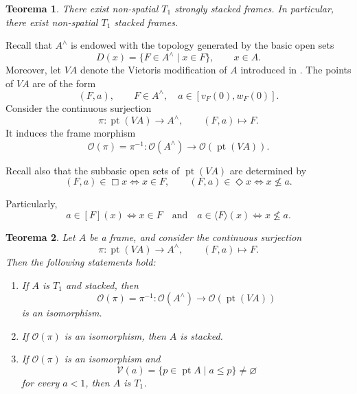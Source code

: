 \documentclass[11pt]{amsart}
\DeclareMathOperator{\pt}{pt}
\theoremstyle{plain}
\newtheorem{thm}{Teorema}[section]
\theoremstyle{definition}
\begin{document}
\begin{thm}\label{T1apiladonoespacial}
There exist non-spatial $T_1$ strongly stacked frames. In particular, there
exist non-spatial $T_1$ stacked frames.
\end{thm}

Recall that $A^\wedge$ is endowed with the topology generated by the basic
open sets
\[
D(x)=\{F\in A^\wedge\mid x\in F\},
\qquad x\in A.
\]
Moreover, let $VA$ denote the Vietoris modification of $A$ introduced in
\cite{johnstone2020vietoris}. The points of $VA$ are of the form
\[
(F,a),
\qquad
F\in A^\wedge,\quad
a\in[v_F(0),w_F(0)].
\]
Consider the continuous surjection
\[
\pi\colon\pt(VA)\longrightarrow A^\wedge,
\qquad
(F,a)\longmapsto F.
\]
It induces the frame morphism
\[
\mathcal{O}(\pi)=\pi^{-1}\colon
\mathcal{O}(A^\wedge)\longrightarrow
\mathcal{O}(\pt(VA)).
\]

Recall also that the subbasic open sets of $\pt(VA)$ are determined by
\begin{equation}\label{fibra}
(F,a)\in\Box x
\Longleftrightarrow
x\in F,
\qquad
(F,a)\in\Diamond x
\Longleftrightarrow
x\nleq a.
\end{equation}

Particularly,
\begin{equation}\label{fibra2}
a\in [F](x)\iff x\in F\quad \text{and}\quad a\in \langle F\rangle(x)\iff x\nleq a.
\end{equation}

\begin{thm}\label{IsoVA}
Let $A$ be a frame, and consider the continuous surjection
\[
\pi\colon\pt(VA)\longrightarrow A^\wedge,
\qquad
(F,a)\longmapsto F.
\]
Then the following statements hold:
\begin{enumerate}
    \item If $A$ is $T_1$ and stacked, then
    \[
    \mathcal{O}(\pi)=\pi^{-1}\colon
    \mathcal{O}(A^\wedge)\longrightarrow\mathcal{O}(\pt(VA))
    \]
    is an isomorphism.

    \item If $\mathcal{O}(\pi)$ is an isomorphism, then $A$ is stacked.

    \item If $\mathcal{O}(\pi)$ is an isomorphism and
    \[
    \mathcal{V}(a)=\{p\in\pt A\mid a\leq p\}\neq\varnothing
    \]
    for every $a<1$, then $A$ is $T_1$.
\end{enumerate}
\end{thm}
\end{document}
